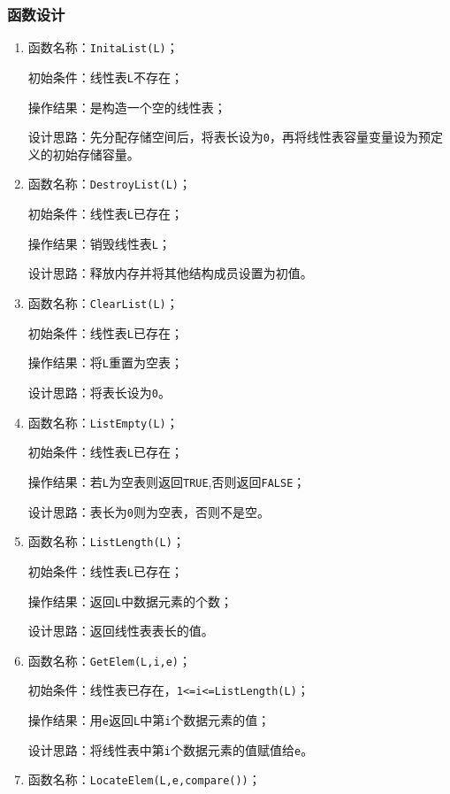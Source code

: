 \documentclass[supercite]{Experimental_Report}
\theoremstyle{definition}
\begin{document}
\subsubsection{函数设计}
\begin{enumerate}
\item 函数名称：\verb|InitaList(L)|；

初始条件：线性表\verb|L|不存在；

操作结果：是构造一个空的线性表；

设计思路：先分配存储空间后，将表长设为\verb|0|，再将线性表容量变量设为预定义的初始存储容量。

\item 函数名称：\verb|DestroyList(L)|；

初始条件：线性表\verb|L|已存在；

操作结果：销毁线性表\verb|L|；

设计思路：释放内存并将其他结构成员设置为初值。

\item 函数名称：\verb|ClearList(L)|；

初始条件：线性表\verb|L|已存在；

操作结果：将\verb|L|重置为空表；

设计思路：将表长设为\verb|0|。

\item 函数名称：\verb|ListEmpty(L)|；

初始条件：线性表\verb|L|已存在；

操作结果：若\verb|L|为空表则返回\verb|TRUE|,否则返回\verb|FALSE|；

设计思路：表长为\verb|0|则为空表，否则不是空。

\item 函数名称：\verb|ListLength(L)|；

初始条件：线性表\verb|L|已存在；

操作结果：返回\verb|L|中数据元素的个数；

设计思路：返回线性表表长的值。

\item 函数名称：\verb|GetElem(L,i,e)|；

初始条件：线性表已存在，\verb|1<=i<=ListLength(L)|；

操作结果：用\verb|e|返回\verb|L|中第\verb|i|个数据元素的值；

设计思路：将线性表中第\verb|i|个数据元素的值赋值给\verb|e|。

\item 函数名称：\verb|LocateElem(L,e,compare())|；


\end{enumerate}
\end{document}

